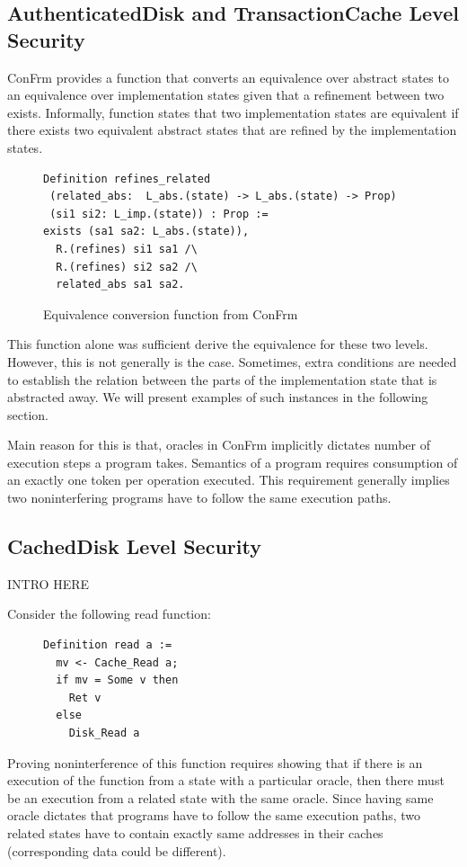 \subsection{AuthenticatedDisk and TransactionCache Level Security}
ConFrm provides a function that converts an equivalence over abstract states to an equivalence over implementation states given that a refinement between two exists. Informally, function states that two implementation states are equivalent if there exists two equivalent abstract states that are refined by the implementation states.

\begin{figure}[H]
    \centering
\begin{verbatim}
Definition refines_related 
 (related_abs:  L_abs.(state) -> L_abs.(state) -> Prop)
 (si1 si2: L_imp.(state)) : Prop :=
exists (sa1 sa2: L_abs.(state)),
  R.(refines) si1 sa1 /\
  R.(refines) si2 sa2 /\
  related_abs sa1 sa2.
\end{verbatim}
    \caption{Equivalence conversion function from ConFrm}
    \label{fig:refines_related}
\end{figure}

This function alone was sufficient derive the equivalence for these two levels. However, this is not generally is the case. Sometimes, extra conditions are needed to establish the relation between the parts of the implementation state that is abstracted away. We will present examples of such instances in the following section.

Main reason for this is that, oracles in ConFrm implicitly dictates number of execution steps a program takes. Semantics of a program requires consumption of an exactly one token per operation executed. This requirement generally implies two noninterfering programs have to follow the same execution paths. 


\subsection{CachedDisk Level Security}
{\color{red} INTRO HERE}

Consider the following read function:

\begin{figure}[H]
    \centering
\begin{verbatim}
Definition read a :=
  mv <- Cache_Read a;
  if mv = Some v then 
    Ret v
  else
    Disk_Read a
\end{verbatim}
    \label{fig:refines_related}
\end{figure}
%
Proving noninterference of this function requires showing that if there is an execution of the function from a state with a particular oracle, then there must be an execution from a related state with the same oracle. Since having same oracle dictates that programs have to follow the same execution paths, two related states have to contain exactly same addresses in their caches (corresponding data could be different).

